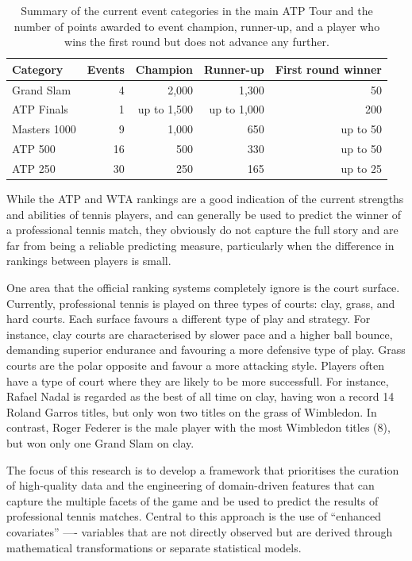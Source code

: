 \documentclass[11pt, oneside]{article}
\begin{document}
\begin{table}[h]
    \center
    \caption{Summary of the current event categories in the main ATP Tour and the number of points
        awarded to event champion, runner-up, and a player who wins the first round but does not
        advance any further.}
    \label{tab:points-awarded-atp}
    \begin{tabular}{lrrrr}
        \toprule
        \textbf{Category} & \textbf{Events} & \textbf{Champion} & \textbf{Runner-up} & \textbf{First round winner} \\
        \midrule
        Grand Slam & 4 & 2,000 & 1,300 & 50 \\
        ATP Finals & 1 & up to 1,500 & up to 1,000 & 200 \\
        Masters 1000 & 9 & 1,000 & 650 & up to 50 \\
        ATP 500 & 16 & 500 & 330 & up to 50 \\
        ATP 250 & 30 & 250 & 165 & up to 25 \\
        \bottomrule
    \end{tabular}
\end{table}

While the ATP and WTA rankings are a good indication of the current strengths and abilities of
tennis players, and can generally be used to predict the winner of a professional tennis match,
they obviously do not capture the full story and are far from being a reliable predicting measure,
particularly when the difference in rankings between players is small.

One area that the official ranking systems completely ignore is the court surface. Currently,
professional tennis is played on three types of courts: clay, grass, and hard courts. Each surface
favours a different type of play and strategy. For instance, clay courts are characterised by
slower pace and a higher ball bounce, demanding superior endurance and favouring a more defensive
type of play. Grass courts are the polar opposite and favour a more attacking style. Players often
have a type of court where they are likely to be more successfull. For instance, Rafael Nadal is
regarded as the best of all time on clay, having won a record 14 Roland Garros titles, but only won
two titles on the grass of Wimbledon. In contrast, Roger Federer is the male player with the most
Wimbledon titles (8), but won only one Grand Slam on clay.

The focus of this research is to develop a framework that prioritises the curation of high-quality
data and the engineering of domain-driven features that can capture the multiple facets of the game
and be used to predict the results of professional tennis matches. Central to this approach is the
use of ``enhanced covariates'' —- variables that are not directly observed but are derived through
mathematical transformations or separate statistical models.
\end{document}
